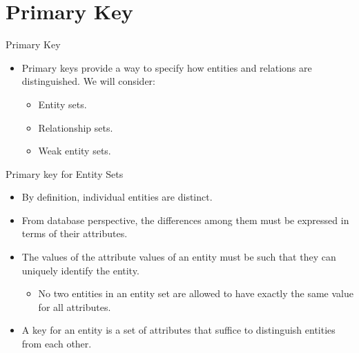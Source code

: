 \documentclass[aspectratio=169]{beamer}
\begin{document}
\section{Primary Key}

\begin{frame}{Primary Key}
    \begin{itemize}
        \item Primary keys provide a way to specify how entities and relations are distinguished. We will consider:
        \begin{itemize}
            \item Entity sets.
            \item Relationship sets.
            \item Weak entity sets.
        \end{itemize}
    \end{itemize}
\end{frame}

\begin{frame}{Primary key for Entity Sets}
    \begin{itemize}
        \item By definition, individual entities are distinct.
        \item From database perspective, the differences among them must be expressed in terms of their attributes.
        \item The values of the attribute values of an entity must be such that they can uniquely identify the entity.
        \begin{itemize}
            \item No two entities in an entity set are allowed to have exactly the same value for all attributes.
        \end{itemize}
        \item A key for an entity is a set of attributes that suffice to distinguish entities from each other.
    \end{itemize}
\end{frame}
\end{document}
